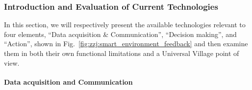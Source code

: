 \documentclass[letterpaper, twocolumn, 10pt, conference]{IEEEtran}
\begin{document}
\subsubsection{Introduction and Evaluation of Current Technologies}
\label{sssec:zzj:smart_environment:evaluate}


In this section, we will respectively present the available technologies relevant to four elements, \enquote{Data acquisition \& Communication}, \enquote{Decision making}, and  \enquote{Action},  shown in Fig.~\ref{fig:zzj:smart_environment_feedback} and then examine them in both their own functional limitations and a Universal Village point of view.



\paragraph{Data acquisition and Communication}
\end{document}
